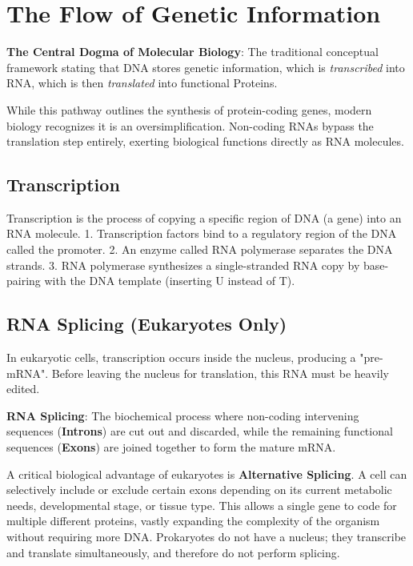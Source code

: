 \section{The Flow of Genetic Information}

\begin{important}
  \textbf{The Central Dogma of Molecular Biology}: The traditional conceptual framework stating that DNA stores genetic information, which is \textit{transcribed} into RNA, which is then \textit{translated} into functional Proteins. 
\end{important}

While this pathway outlines the synthesis of protein-coding genes, modern biology recognizes it is an oversimplification. Non-coding RNAs bypass the translation step entirely, exerting biological functions directly as RNA molecules.


\subsection{Transcription}
Transcription is the process of copying a specific region of DNA (a gene) into an RNA molecule. 
1. Transcription factors bind to a regulatory region of the DNA called the promoter.
2. An enzyme called RNA polymerase separates the DNA strands.
3. RNA polymerase synthesizes a single-stranded RNA copy by base-pairing with the DNA template (inserting U instead of T).

\subsection{RNA Splicing (Eukaryotes Only)}
In eukaryotic cells, transcription occurs inside the nucleus, producing a "pre-mRNA". Before leaving the nucleus for translation, this RNA must be heavily edited.

\begin{important}
  \textbf{RNA Splicing}: The biochemical process where non-coding intervening sequences (\textbf{Introns}) are cut out and discarded, while the remaining functional sequences (\textbf{Exons}) are joined together to form the mature mRNA.
\end{important}

\sta A critical biological advantage of eukaryotes is \textbf{Alternative Splicing}. A cell can selectively include or exclude certain exons depending on its current metabolic needs, developmental stage, or tissue type. This allows a single gene to code for multiple different proteins, vastly expanding the complexity of the organism without requiring more DNA. Prokaryotes do not have a nucleus; they transcribe and translate simultaneously, and therefore do not perform splicing.

